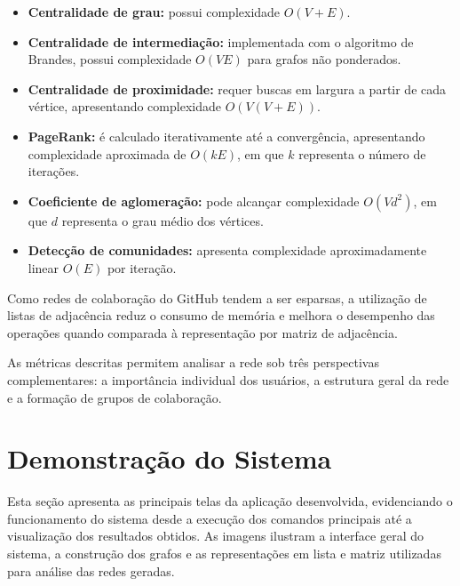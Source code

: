 \documentclass[12pt]{article}
\begin{document}
\begin{itemize}

\item \textbf{Centralidade de grau:} possui complexidade \(O(V+E)\).

\item \textbf{Centralidade de intermediação:} implementada com o algoritmo de Brandes, possui complexidade \(O(VE)\) para grafos não ponderados.

\item \textbf{Centralidade de proximidade:} requer buscas em largura a partir de cada vértice, apresentando complexidade \(O(V(V+E))\).

\item \textbf{PageRank:} é calculado iterativamente até a convergência, apresentando complexidade aproximada de \(O(kE)\), em que \(k\) representa o número de iterações.

\item \textbf{Coeficiente de aglomeração:} pode alcançar complexidade \(O(Vd^2)\), em que \(d\) representa o grau médio dos vértices.

\item \textbf{Detecção de comunidades:} apresenta complexidade aproximadamente linear \(O(E)\) por iteração.

\end{itemize}

Como redes de colaboração do GitHub tendem a ser esparsas, a utilização de listas de adjacência reduz o consumo de memória e melhora o desempenho das operações quando comparada à representação por matriz de adjacência.

As métricas descritas permitem analisar a rede sob três perspectivas complementares: a importância individual dos usuários, a estrutura geral da rede e a formação de grupos de colaboração.


\section{Demonstração do Sistema}

Esta seção apresenta as principais telas da aplicação desenvolvida, evidenciando o funcionamento do sistema desde a execução dos comandos principais até a visualização dos resultados obtidos. As imagens ilustram a interface geral do sistema, a construção dos grafos e as representações em lista e matriz utilizadas para análise das redes geradas.
\end{document}
